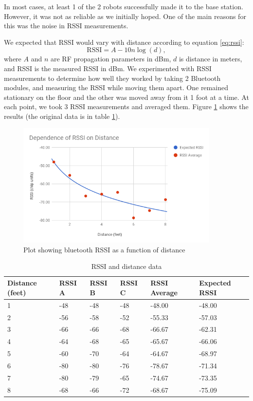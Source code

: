 \documentclass[]{article}
\begin{document}
In most cases, at least 1 of the 2 robots successfully made it to the
base station. However, it was not as reliable as we initially hoped. One
of the main reasons for this was the noise in RSSI measurements.

We expected that RSSI would vary with distance according to equation \ref{eq:rssi}:
\begin{equation} \label{eq:rssi}
  \text{RSSI} = A - 10 n \log(d),
\end{equation}
where $A$ and $n$ are RF propagation parameters in dBm, $d$ is distance in meters, and RSSI is the measured RSSI in dBm. \cite{5415423}
We experimented with RSSI measurements to determine how well they worked by taking 2 Bluetooth modules, and measuring the RSSI while moving them apart.
One remained stationary on the floor and the other was moved away from it 1 foot at a time.
At each point, we took 3 RSSI measurements and averaged them. Figure \ref{fig:rssiplot} shows the results (the original data is in table \ref{table:rssidata}).

\begin{figure}
  \centering
  \includegraphics[width=0.9\textwidth]{rssi-chart.png}
  \caption{Plot showing bluetooth RSSI as a function of distance}
  \label{fig:rssiplot}
\end{figure}

\begin{table}
  \centering
  \begin{tabular}[]{@{}llllll@{}}
  \toprule
  Distance (feet) & RSSI A & RSSI B & RSSI C & RSSI Average & Expected
  RSSI \\
  \midrule
  1 & -48 & -48 & -48 & -48.00 & -48.00 \\
  2 & -56 & -58 & -52 & -55.33 & -57.03 \\
  3 & -66 & -66 & -68 & -66.67 & -62.31 \\
  4 & -64 & -68 & -65 & -65.67 & -66.06 \\
  5 & -60 & -70 & -64 & -64.67 & -68.97 \\
  6 & -80 & -80 & -76 & -78.67 & -71.34 \\
  7 & -80 & -79 & -65 & -74.67 & -73.35 \\
  8 & -68 & -66 & -72 & -68.67 & -75.09 \\
  \bottomrule
  \end{tabular}
  \caption{RSSI and distance data}
  \label{table:rssidata}
\end{table}
\end{document}
